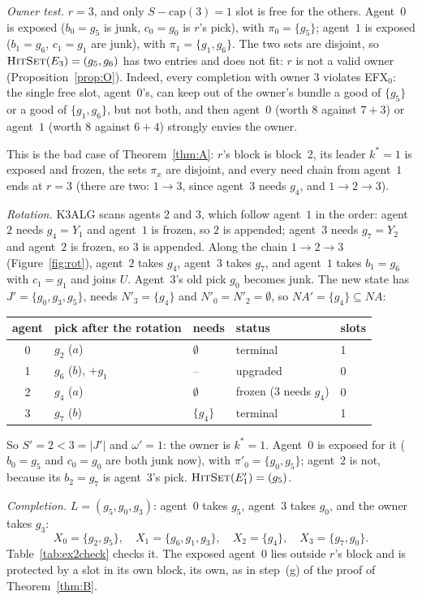 \documentclass[runningheads,11pt]{llncs}
\newcommand{\efxz}{\texorpdfstring{\mbox{EFX$_0$}}{EFX0}}
\newcommand{\NA}{\mathit{NA}}
\newcommand{\capa}{\mathrm{cap}}
\newcommand{\HitSet}{\textup{\textsc{HitSet}}}
\begin{document}
\begin{example}[a rotation]
\emph{Owner test.} $r=3$, and only $S-\capa(3)=1$ slot is free for the others. Agent~$0$ is exposed ($b_0=g_5$ is junk, $c_0=g_0$ is $r$'s pick), with $\pi_0=\{g_5\}$; agent~$1$ is exposed ($b_1=g_6$, $c_1=g_1$ are junk), with $\pi_1=\{g_1,g_6\}$. The two sets are disjoint, so $\HitSet(E_3)=(g_5,g_6)$ has two entries and does not fit: $r$ is not a valid owner (Proposition~\ref{prop:O}). Indeed, every completion with owner $3$ violates \efxz{}: the single free slot, agent~$0$'s, can keep out of the owner's bundle a good of $\{g_5\}$ or a good of $\{g_1,g_6\}$, but not both, and then agent~$0$ (worth $8$ against $7+3$) or agent~$1$ (worth $8$ against $6+4$) strongly envies the owner.

This is the bad case of Theorem~\ref{thm:A}: $r$'s block is block~2, its leader $k^*=1$ is exposed and frozen, the sets $\pi_x$ are disjoint, and every need chain from agent~$1$ ends at $r=3$ (there are two: $1\to3$, since agent~$3$ needs $g_4$, and $1\to2\to3$).

\emph{Rotation.} K3ALG scans agents $2$ and $3$, which follow agent~$1$ in the order: agent~$2$ needs $g_4=Y_1$ and agent~$1$ is frozen, so $2$ is appended; agent~$3$ needs $g_7=Y_2$ and agent~$2$ is frozen, so $3$ is appended. Along the chain $1\to2\to3$ (Figure~\ref{fig:rot}), agent~$2$ takes $g_4$, agent~$3$ takes $g_7$, and agent~$1$ takes $b_1=g_6$ with $c_1=g_1$ and joins $U$. Agent~$3$'s old pick $g_0$ becomes junk. The new state has $J'=\{g_0,g_3,g_5\}$, needs $N'_3=\{g_4\}$ and $N'_0=N'_2=\emptyset$, so $\NA'=\{g_4\}\subseteq\NA$:
\begin{center}\small
\setlength{\tabcolsep}{4pt}\begin{tabular}{@{}cllll@{}}
\toprule
agent & pick after the rotation & needs & status & slots \\
\midrule
0 & $g_2$ ($a$) & $\emptyset$ & terminal & 1 \\
1 & $g_6$ ($b$), $+g_1$ & -- & upgraded & 0 \\
2 & $g_4$ ($a$) & $\emptyset$ & frozen (3 needs $g_4$) & 0 \\
3 & $g_7$ ($b$) & $\{g_4\}$ & terminal & 1 \\
\bottomrule
\end{tabular}
\end{center}
So $S'=2<3=|J'|$ and $\omega'=1$: the owner is $k^*=1$. Agent~$0$ is exposed for it ($b_0=g_5$ and $c_0=g_0$ are both junk now), with $\pi'_0=\{g_0,g_5\}$; agent~$2$ is not, because its $b_2=g_7$ is agent~$3$'s pick. $\HitSet(E'_1)=(g_5)$.

\emph{Completion.} $L=(g_5,g_0,g_3)$: agent~$0$ takes $g_5$, agent~$3$ takes $g_0$, and the owner takes $g_3$:
\[
X_0=\{g_2,g_5\},\quad X_1=\{g_6,g_1,g_3\},\quad X_2=\{g_4\},\quad X_3=\{g_7,g_0\}.
\]
Table~\ref{tab:ex2check} checks it. The exposed agent~$0$ lies outside $r$'s block and is protected by a slot in its own block, its own, as in step~(g) of the proof of Theorem~\ref{thm:B}.
\end{example}
\end{document}
